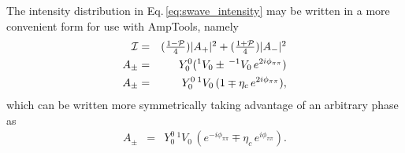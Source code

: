 The intensity distribution in Eq.\,\ref{eq:swave_intensity} may be written in a more convenient form for use with AmpTools, namely
\begin{eqnarray}
\mathcal{I} & = & (\textstyle{1-\mathcal{P} \over 4}) |A_{+}|^2 +  (\textstyle{1+\mathcal{P} \over 4}) |A_{-}|^2 \\
A_{\pm} & = & Y^0_0 (^{1}V_0 \pm \,^{-1}V_0 \, e^{2i\phi_{\pi\pi}} )\\
A_{\pm} & = & Y^0_0 \, ^{1}V_0\,(1 \mp \eta_c\, e^{2i\phi_{\pi\pi}}),
\end{eqnarray}
which can be written more symmetrically taking advantage of an arbitrary phase as
\begin{eqnarray}
A_{\pm} & = & Y^0_0 \, ^{1}V_0\,(e^{-i\phi_{\pi\pi}}  \mp \eta_c\, e^{i\phi_{\pi\pi}}).  \label{eq:PhiAmplitude}
\end{eqnarray}
